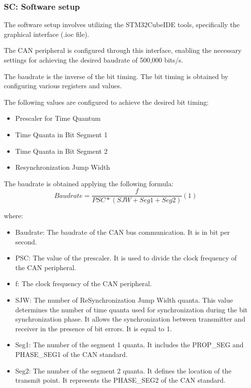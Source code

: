 


\subsubsection{SC: Software setup}

The software setup involves utilizing the STM32CubeIDE tools, specifically the graphical interface (.ioc file). 

The CAN peripheral is configured through this interface, enabling the necessary settings for achieving the desired baudrate of 500,000 bits/s. 

The baudrate is the inverse of the bit timing. The bit timing is obtained by configuring various registers and values.

The following values are configured to achieve the desired bit timing:

\begin{itemize}
    \item Prescaler for Time Quantum
    \item Time Quanta in Bit Segment 1
    \item Time Quanta in Bit Segment 2
    \item Resynchronization Jump Width
\end{itemize}

The baudrate is obtained applying the following formula: \cite{R5}
\[
Baudrate = \frac{f}{PSC*(SJW+Seg1+Seg2)} (1)
\]

where:
\begin{itemize}
  \item Baudrate: The baudrate of the CAN bus communication. It is in bit per second.
  \item PSC: The value of the prescaler. It is used to divide the clock frequency of the CAN peripheral.
  \item f: The clock frequency of the CAN peripheral.
  \item SJW: The number of ReSynchronization Jump Width quanta. This value determines the number of time quanta used for synchronization during the bit synchronization phase. It allows the synchronization between transmitter and receiver in the presence of bit errors. It is equal to 1.
  \item Seg1: The number of the segment 1 quanta. It includes the PROP\_SEG and PHASE\_SEG1 of the CAN standard.
  \item Seg2: The number of the segment 2 quanta. It defines the location of the transmit point. It represents the PHASE\_SEG2 of the CAN standard.
\end{itemize}

